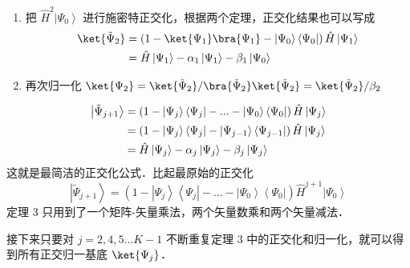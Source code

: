 \begin{enumerate}[resume]
\item 把 ${\hat H^2}\left| {\Psi_0} \right\rangle$ 进行施密特正交化，根据两个定理，正交化结果也可以写成
\begin{equation}
\begin{aligned}
\ket{{\tilde \Psi }_2}  &= \left( {1 -\ket{\Psi_1}  \bra {\Psi_1}  - \left| {\Psi_0} \right\rangle \left\langle {\Psi_0} \right|} \right)\hat H\left| {\Psi_1} \right\rangle \\
   &= \hat H\left| {\Psi_1} \right\rangle  - {\alpha_1}\left| {\Psi_1} \right\rangle  - {\beta_1}\left| {\Psi_0} \right\rangle \\ 
\end{aligned}
\end{equation}
\item 再次归一化  $\ket{\Psi_2} = \ket{\tilde\Psi_2}/\bra{\tilde\Psi_2}\ket{\tilde\Psi_2} = \ket{\tilde\Psi_2}/\beta_2$
\end{enumerate}

{\noindent {}}
\begin{equation}\begin{aligned}
  \left| {{\tilde \Psi }_{j + 1}} \right\rangle  &= \left( {1 - \left| {\Psi_j} \right\rangle \left\langle {\Psi_j} \right| - ... - \left| {\Psi_0} \right\rangle \left\langle {\Psi_0} \right|} \right)\hat H\left| {\Psi_j} \right\rangle\\
&= \left( {1 - \left| {\Psi_j} \right\rangle \left\langle {\Psi_j} \right| - \left| {\Psi_{j - 1}} \right\rangle \left\langle {\Psi_{j - 1}} \right|} \right)\hat H\left| {\Psi_j} \right\rangle  \hfill \\
&= \hat H\left| {\Psi_j} \right\rangle  - {\alpha_j}\left| {\Psi_j} \right\rangle  - {\beta_j}\left| {\Psi_j} \right\rangle 
\end{aligned}\end{equation}
这就是最简洁的正交化公式．比起最原始的正交化
\begin{equation}
\left| {{\tilde \Psi }_{j + 1}} \right\rangle  = \left( {1 - \left| {\Psi_j} \right\rangle \left\langle {\Psi_j} \right| - ... - \left| {\Psi_0} \right\rangle \left\langle {\Psi_0} \right|} \right){\hat H^{j + 1}}\left| {\Psi_0} \right\rangle 
\end{equation}
定理 3 只用到了一个矩阵-矢量乘法，两个矢量数乘和两个矢量减法．

接下来只要对 $j = 2,4,5...K - 1$ 不断重复定理 3 中的正交化和归一化，就可以得到所有正交归一基底 $\ket{\Psi_j} $．

